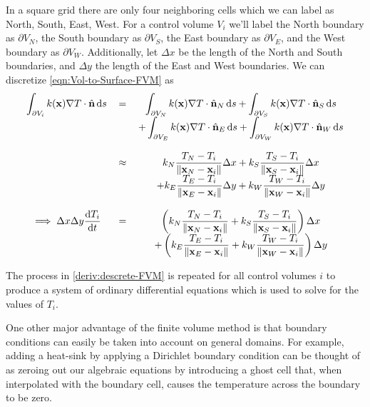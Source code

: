 In a square grid there are only four neighboring cells which we can label as North, South, East, West. For a control volume $V_i$ we'll label the North boundary as $\partial V_N$, the South boundary as $\partial V_S$, the East boundary as $\partial V_E$, and the West boundary as $\partial V_W$. Additionally, let $\Delta x$ be the length of the North and South boundaries, and $\Delta y$ the length of the East and West boundaries. We can discretize \eqref{eqn:Vol-to-Surface-FVM} as
\begin{equation}
	\begin{tabular}{ccc}
		$\displaystyle\int_{\partial V_i}k(\mathbf{x})\nabla T\cdot\hat{\mathbf{n}}\dif s$ & $=$ & $\displaystyle\int_{\partial V_N}k(\mathbf{x})\nabla T\cdot\hat{\mathbf{n}}_N\dif s+\int_{\partial V_S}k(\mathbf{x})\nabla T\cdot\hat{\mathbf{n}}_S\dif s$\\
		 &  & $\displaystyle+\int_{\partial V_E}k(\mathbf{x})\nabla T\cdot\hat{\mathbf{n}}_E\dif s+\int_{\partial V_W}k(\mathbf{x})\nabla T\cdot\hat{\mathbf{n}}_W\dif s$\\
		 & & \\
		 & $\approx$ & $\displaystyle k_N\frac{T_N-T_i}{\|\mathbf{x}_N-\mathbf{x}_i\|}\Delta x+k_S\frac{T_S-T_i}{\|\mathbf{x}_S-\mathbf{x}_i\|}\Delta x$\\
		 & & $\displaystyle+k_E\frac{T_E-T_i}{\|\mathbf{x}_E-\mathbf{x}_i\|}\Delta y+k_W\frac{T_W-T_i}{\|\mathbf{x}_W-\mathbf{x}_i\|}\Delta y$\\
		 & & \\
		 $\displaystyle\implies \Delta x\Delta y\frac{\dif T_i}{\dif t}$ & $=$ & $\displaystyle\left( k_N\frac{T_N-T_i}{\|\mathbf{x}_N-\mathbf{x}_i\|}+k_S\frac{T_S-T_i}{\|\mathbf{x}_S-\mathbf{x}_i\|}\right)\Delta x$\\
		 & & $\displaystyle+\left(k_E\frac{T_E-T_i}{\|\mathbf{x}_E-\mathbf{x}_i\|}+k_W\frac{T_W-T_i}{\|\mathbf{x}_W-\mathbf{x}_i\|}\right)\Delta y$
	\end{tabular}\label{deriv:descrete-FVM}
\end{equation}

The process in \eqref{deriv:descrete-FVM} is repeated for all control volumes $i$ to produce a system of ordinary differential equations which is used to solve for the values of $T_i$.

One other major advantage of the finite volume method is that boundary conditions can easily be taken into account on general domains. For example, adding a heat-sink by applying a Dirichlet boundary condition can be thought of as zeroing out our algebraic equations by introducing a ghost cell that, when interpolated with the boundary cell, causes the temperature across the boundary to be zero.